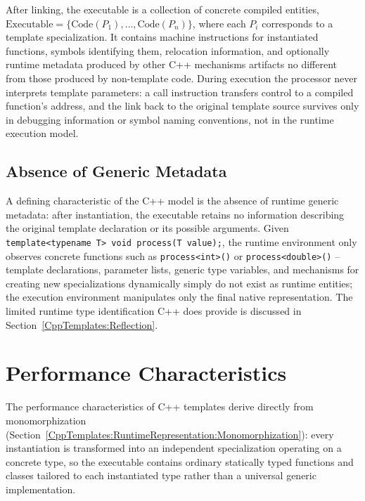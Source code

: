 \documentclass[11pt]{report}
\begin{document}
After linking, the executable is a collection of concrete compiled entities,
$\text{Executable} = \{\text{Code}(P_1), \allowbreak \dots,  \text{Code}(P_n)\}$, 
where each $P_i$ corresponds to a
template specialization. It contains machine instructions for instantiated
functions, symbols identifying them, relocation information, and optionally
runtime metadata produced by other C++ mechanisms artifacts no different from those produced by non-template code. During
execution the processor never interprets template parameters: a call instruction
transfers control to a compiled function's address, and the link back to the
original template source survives only in debugging information or symbol
naming conventions, not in the runtime execution model.

\subsection{Absence of Generic Metadata}

A defining characteristic of the C++ model is the absence of runtime generic
metadata: after instantiation, the executable retains no information describing
the original template declaration or its possible arguments. Given
\texttt{template<typename T> void process(T value);}, the runtime environment
only observes concrete functions such as \texttt{process<int>()} or
\texttt{process<double>()} -- template declarations, parameter lists, generic
type variables, and mechanisms for creating new specializations dynamically
simply do not exist as runtime entities; the execution environment manipulates
only the final native representation. The limited runtime type identification
C++ does provide is discussed in Section~\ref{CppTemplates:Reflection}.


\section{Performance Characteristics}
\label{CppTemplates:Performance}

The performance characteristics of C++ templates derive directly from
monomorphization (Section~\ref{CppTemplates:RuntimeRepresentation:Monomorphization}): every instantiation is
transformed into an independent specialization operating on a concrete type, so
the executable contains ordinary statically typed functions and classes tailored
to each instantiated type rather than a universal generic implementation.
\end{document}
